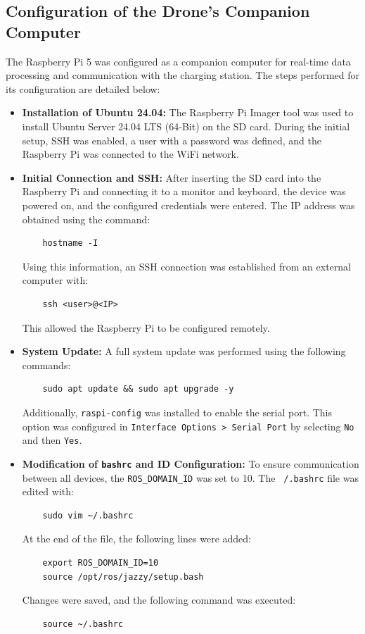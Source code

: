 \subsection{Configuration of the Drone's Companion Computer} 
The Raspberry Pi 5 was configured as a companion computer for real-time data processing and communication with the charging station. The steps performed for its configuration are detailed below:

\begin{itemize}
    \item \textbf{Installation of Ubuntu 24.04:} 
    The Raspberry Pi Imager tool was used to install Ubuntu Server 24.04 LTS (64-Bit) on the SD card. During the initial setup, SSH was enabled, a user with a password was defined, and the Raspberry Pi was connected to the WiFi network.
    
    \item \textbf{Initial Connection and SSH:} 
    After inserting the SD card into the Raspberry Pi and connecting it to a monitor and keyboard, the device was powered on, and the configured credentials were entered. The IP address was obtained using the command:
    \begin{verbatim}
    hostname -I
    \end{verbatim}
    Using this information, an SSH connection was established from an external computer with:
    \begin{verbatim}
    ssh <user>@<IP>
    \end{verbatim}
    This allowed the Raspberry Pi to be configured remotely.
    
    \item \textbf{System Update:} 
    A full system update was performed using the following commands:
    \begin{verbatim}
    sudo apt update && sudo apt upgrade -y
    \end{verbatim}
    Additionally, \texttt{raspi-config} was installed to enable the serial port. This option was configured in \texttt{Interface Options > Serial Port} by selecting \texttt{No} and then \texttt{Yes}.
    
    \item \textbf{Modification of \texttt{bashrc} and ID Configuration:} 
    To ensure communication between all devices, the \texttt{ROS\_DOMAIN\_ID} was set to 10. The \texttt{~/.bashrc} file was edited with:
    \begin{verbatim}
    sudo vim ~/.bashrc
    \end{verbatim}
    At the end of the file, the following lines were added:
    \begin{verbatim}
    export ROS_DOMAIN_ID=10
    source /opt/ros/jazzy/setup.bash
    \end{verbatim}
    Changes were saved, and the following command was executed:
    \begin{verbatim}
    source ~/.bashrc
    \end{verbatim}
    

\end{itemize}
